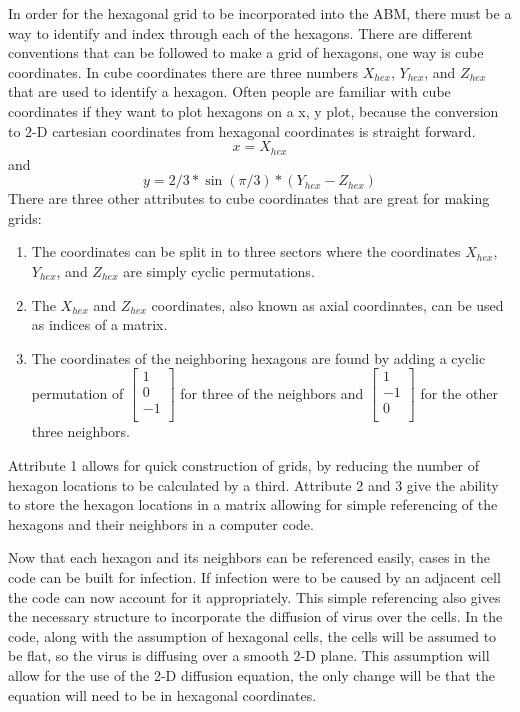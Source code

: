 \documentclass[a4paper]{article}
\begin{document}
In order for the hexagonal grid to be incorporated into the ABM, there must be a way to identify and index through each of the hexagons. There are different conventions that can be followed to make a grid of hexagons, one way is cube coordinates. In cube coordinates there are three numbers $X_{hex}$, $Y_{hex}$, and $Z_{hex}$ that are used to identify a hexagon. Often people are familiar with cube coordinates if they want to plot hexagons on a x, y plot, because the conversion to 2-D cartesian coordinates from hexagonal coordinates is straight forward. $$x = X_{hex}$$ and $$y = 2/3*\sin(\pi/3)*\left ( Y_{hex}-Z_{hex} \right )$$ There are three other attributes to cube coordinates that are great for making grids:
\begin{enumerate} 
    \item The coordinates can be split in to three sectors where the coordinates $X_{hex}$, $Y_{hex}$, and $Z_{hex}$ are simply cyclic permutations.
    \item The $X_{hex}$ and $Z_{hex}$ coordinates, also known as axial coordinates, can be used as indices of a matrix.
    \item  The coordinates of the neighboring hexagons are found by adding a cyclic permutation of 
        $\left [
            \begin{array}{c}
                1 \\
                0 \\
                -1\\
            \end{array}
        \right ]$
        for three of the neighbors and
        $\left [ 
            \begin{array}{c}
                1 \\
                -1 \\
                0\\
            \end{array}
        \right ]$
        for the other three neighbors.
\end{enumerate}
Attribute 1 allows for quick construction of grids, by reducing the number of hexagon locations to be calculated by a third. Attribute 2 and 3 give the ability to store the hexagon locations in a matrix allowing for simple referencing of the hexagons and their neighbors in a computer code. 

Now that each hexagon and its neighbors can be referenced easily, cases in the code can be built for infection. If infection were to be caused by an adjacent cell the code can now account for it appropriately. This simple referencing also gives the necessary structure to incorporate the diffusion of virus over the cells. In the code, along with the assumption of hexagonal cells, the cells will be assumed to be flat, so the virus is diffusing over a smooth 2-D plane. This assumption will allow for the use of the 2-D diffusion equation, the only change will be that the equation will need to be in hexagonal coordinates. 
\end{document}
